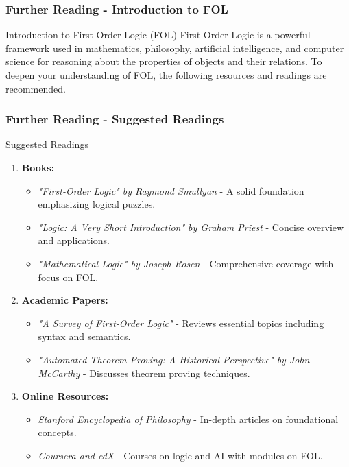 \documentclass[aspectratio=169]{beamer}
\begin{document}
\begin{frame}[fragile]
    \frametitle{Further Reading - Introduction to FOL}
    \begin{block}{Introduction to First-Order Logic (FOL)}
        First-Order Logic is a powerful framework used in mathematics, philosophy, artificial intelligence, and computer science for reasoning about the properties of objects and their relations. 
        To deepen your understanding of FOL, the following resources and readings are recommended.
    \end{block}
\end{frame}

\begin{frame}[fragile]
    \frametitle{Further Reading - Suggested Readings}
    \begin{block}{Suggested Readings}
        \begin{enumerate}
            \item \textbf{Books:}
                \begin{itemize}
                    \item \textit{"First-Order Logic" by Raymond Smullyan} - A solid foundation emphasizing logical puzzles.
                    \item \textit{"Logic: A Very Short Introduction" by Graham Priest} - Concise overview and applications.
                    \item \textit{"Mathematical Logic" by Joseph Rosen} - Comprehensive coverage with focus on FOL.
                \end{itemize}
            \item \textbf{Academic Papers:}
                \begin{itemize}
                    \item \textit{"A Survey of First-Order Logic"} - Reviews essential topics including syntax and semantics.
                    \item \textit{"Automated Theorem Proving: A Historical Perspective" by John McCarthy} - Discusses theorem proving techniques.
                \end{itemize}
            \item \textbf{Online Resources:}
                \begin{itemize}
                    \item \textit{Stanford Encyclopedia of Philosophy} - In-depth articles on foundational concepts.
                    \item \textit{Coursera and edX} - Courses on logic and AI with modules on FOL.
                \end{itemize}
        \end{enumerate}
    \end{block}
\end{frame}
\end{document}
